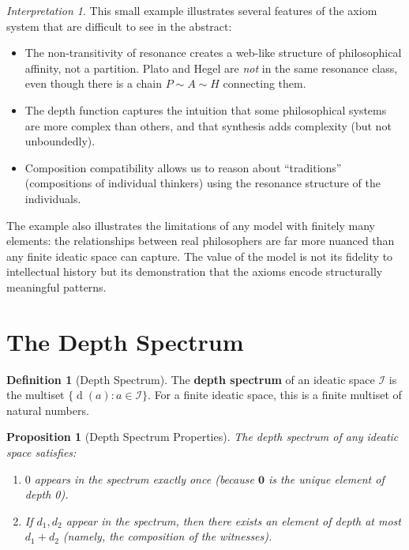 \documentclass[11pt,openany]{book}
\theoremstyle{definition}
\newtheorem{definition}[axiom]{Definition}
\theoremstyle{plain}
\newtheorem{proposition}[axiom]{Proposition}
\theoremstyle{remark}
\newtheorem{interpretation}[axiom]{Interpretation}
\newcommand{\IS}{\mathcal{I}}               %
\newcommand{\void}{\mathbf{0}}              %
\newcommand{\res}{\sim}                      %
\newcommand{\depth}{\operatorname{d}}       %
\begin{document}
\begin{interpretation}
This small example illustrates several features of the axiom system that are difficult to see in the abstract:
\begin{itemize}
\item The non-transitivity of resonance creates a web-like structure of philosophical affinity, not a partition. Plato and Hegel are \emph{not} in the same resonance class, even though there is a chain $P \res A \res H$ connecting them.
\item The depth function captures the intuition that some philosophical systems are more complex than others, and that synthesis adds complexity (but not unboundedly).
\item Composition compatibility allows us to reason about ``traditions'' (compositions of individual thinkers) using the resonance structure of the individuals.
\end{itemize}

The example also illustrates the limitations of any model with finitely many elements: the relationships between real philosophers are far more nuanced than any finite ideatic space can capture. The value of the model is not its fidelity to intellectual history but its demonstration that the axioms encode structurally meaningful patterns.
\end{interpretation}

\section{The Depth Spectrum}

\begin{definition}[Depth Spectrum]
The \textbf{depth spectrum} of an ideatic space $\IS$ is the multiset $\{\depth(a) : a \in \IS\}$. For a finite ideatic space, this is a finite multiset of natural numbers.
\end{definition}

\begin{proposition}[Depth Spectrum Properties]
The depth spectrum of any ideatic space satisfies:
\begin{enumerate}
\item $0$ appears in the spectrum exactly once (because $\void$ is the unique element of depth 0).
\item If $d_1, d_2$ appear in the spectrum, then there exists an element of depth at most $d_1 + d_2$ (namely, the composition of the witnesses).
\end{enumerate}
\end{proposition}
\end{document}
